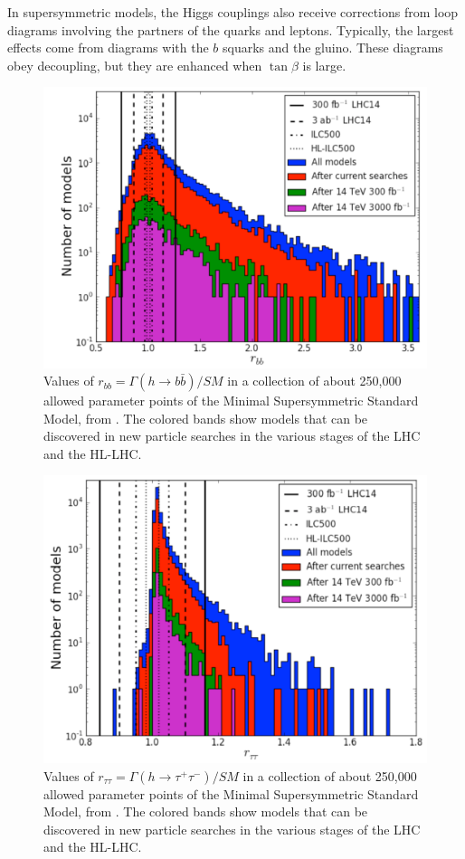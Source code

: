 \documentclass[12pt]{article}
\begin{document}
In supersymmetric models, the Higgs couplings also receive corrections
from loop diagrams involving the partners of the quarks and leptons.  Typically,
the largest effects come from diagrams with the $b$ squarks and the
gluino.  These diagrams obey decoupling, but they are enhanced  when
$\tan \beta$ is large.

\begin{figure}
\begin{center}
\includegraphics[width=0.70\hsize]{PMSSMb.pdf}
\end{center}
\caption{Values of $r_{bb} = \Gamma(h\to b\bar b)/SM$ in a
  collection of about 250,000 allowed parameter points of the Minimal
  Supersymmetric  Standard Model, from \cite{PMSSM}.    The colored
  bands show models that can be discovered in new particle searches in
  the various stages of the LHC and the HL-LHC.}
\label{fig:PMSSMb}
\end{figure}

\begin{figure}
\begin{center}
\includegraphics[width=0.70\hsize]{PMSSMtau.pdf}
\end{center}
\caption{Values of $r_{\tau\tau} = \Gamma(h\to \tau^+\tau^-)/SM$ in a
  collection of about 250,000 allowed parameter points of the Minimal
  Supersymmetric  Standard Model, from \cite{PMSSM}.    The colored
  bands show models that can be discovered in new particle searches in
  the various stages of the LHC and the HL-LHC.}
\label{fig:PMSSMtau}
\end{figure}
\end{document}
